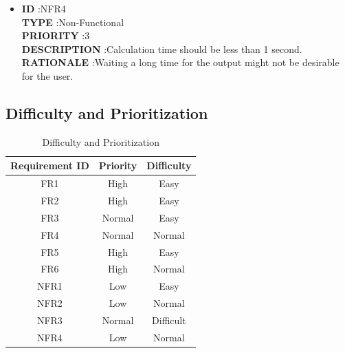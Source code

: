 \documentclass[a4paper,12pt]{article}
\begin{document}
\begin{itemize}
	
	\item \textbf{ID } \hspace{3cm} :NFR4  \\
	\textbf{TYPE } \hspace{2.27cm}  :Non-Functional\\
	\textbf{PRIORITY } \hspace{1.15cm} :3 \\
	\textbf{DESCRIPTION }\hspace{0.35cm} :Calculation time should be less than 1 second. \\
	\textbf{RATIONALE } \hspace{0.75cm} :Waiting a long time for the output might not be desirable for the user.  \\
	
	
\end{itemize}


\subsection{Difficulty and Prioritization}


\begin{table}[htp]
	\centering
	\caption{Difficulty and Prioritization} \vspace{0.5cm} \label{tab:difficulty_table} 
	\begin{tabular}{||c|c|c||}
		\hline  \hline \textbf{Requirement ID} & \textbf{Priority} & \textbf{Difficulty} \\
		\hline \hline
		FR1 & High & Easy \\ 
		\hline
		FR2 & High & Easy \\ 
		\hline
		FR3 & Normal & Easy  \\ 
		\hline
		FR4 & Normal & Normal \\ 
		\hline
		FR5 & High & Easy  \\ 
		\hline
		FR6 & High & Normal \\ 
		\hline
		NFR1 & Low & Easy  \\ 
		\hline
		NFR2 & Low & Normal  \\ 
		\hline
		NFR3 & Normal & Difficult  \\ 
		\hline
		NFR4 & Low & Normal  \\ 
		\hline
	\end{tabular}
\end{table}
\end{document}
